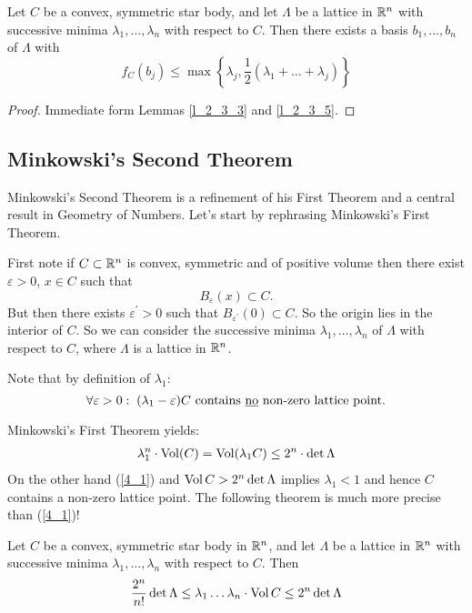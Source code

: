 \documentclass[NumTh.tex]{subfiles}
\begin{document}
\begin{cor}\label{2_3_6}
  Let $C$ be a convex, symmetric star body, and let $\Lambda$ be a lattice in $\mathbb{R}^n$ with successive minima $\lambda_1,\dots,\lambda_n$ with respect to $C$.
  Then there exists a basis $b_1,\dots,b_n$ of $\Lambda$ with
  \[ f_C(b_j) \leq \max \left\lbrace \lambda_j, \frac{1}{2}(\lambda_1 + \dots + \lambda_j) \right\rbrace \]
\end{cor}

\begin{proof}
  Immediate form Lemmas \ref{l_2_3_3} and \ref{l_2_3_5}.
\end{proof}


\subsection{Minkowski's Second Theorem}

Minkowski's Second Theorem is a refinement of his First Theorem and a central result in Geometry of Numbers.
Let's start by rephrasing Minkowski's First Theorem.%

First note if $C \subset \mathbb{R}^n$ is convex, symmetric and of positive volume then there exist $\varepsilon > 0$, $x \in C$ such that
\[ B_\varepsilon(x) \subset C \text{.} \]
But then there exists $\varepsilon^\prime > 0$ such that $B_{\varepsilon^\prime}(0) \subset C$.
So the origin lies in the interior of $C$.
So we can consider the successive minima $\lambda_1,\dots,\lambda_n$ of $\Lambda$ with respect to $C$, where $\Lambda$ is a lattice in $\mathbb{R}^n$.

Note that by definition of $\lambda_1$:
\[ \forall \varepsilon > 0: \; (\lambda_1 - \varepsilon) C \text{ contains \underline{no} non-zero lattice point.} \]

Minkowski's First Theorem yields:
\begin{align}
  \lambda_1^n \cdot \operatorname{Vol}(C) = \operatorname{Vol}(\lambda_1 C) \leq 2^n \cdot \det \Lambda \label{4_1}
\end{align}
On the other hand (\ref{4_1}) and $\operatorname{Vol} C > 2^n \det \Lambda$ implies $\lambda_1 < 1$ and hence $C$ contains a non-zero lattice point.
The following theorem is much more precise than (\ref{4_1})!

\begin{theorem}
  Let $C$ be a convex, symmetric star body in $\mathbb{R}^n$, and let $\Lambda$ be a lattice in $\mathbb{R}^n$ with successive minima $\lambda_1,\dots,\lambda_n$ with respect to $C$. Then
  \[ \frac{2^n}{n!} \det \Lambda \leq \lambda_1 \dots \lambda_n \cdot \operatorname{Vol} C \leq 2^n \det \Lambda \]
\end{theorem}
\end{document}
